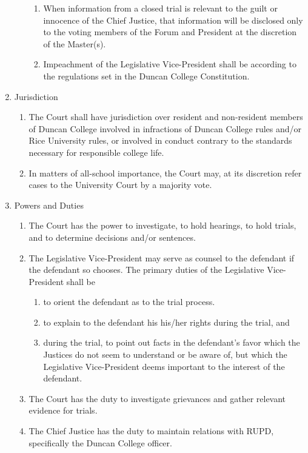 \documentclass[11pt]{amsart}
\begin{document}
\begin{enumerate}
\begin{enumerate}
\begin{enumerate}
			\item When information from a closed trial is relevant to the guilt or innocence of the Chief Justice, that information will be disclosed only to the voting members of the Forum and President at the discretion of the Master(s).
			\item Impeachment of the Legislative Vice-President shall be according to the regulations set in the Duncan College Constitution.
			\end{enumerate}
		
	\end{enumerate}
	
\item Jurisdiction
	\begin{enumerate}
		\item The Court shall have jurisdiction over resident and non-resident members of Duncan College involved in infractions of Duncan College rules and/or Rice University rules, or involved in conduct contrary to the standards necessary for responsible college life.	
		\item  In matters of all-school importance, the Court may, at its discretion refer cases to the University Court by a majority vote.
	\end{enumerate}
\item Powers and Duties
	\begin{enumerate}
	\item The Court has the power to investigate, to hold hearings, to hold trials, and to determine decisions and/or sentences.
	\item The Legislative Vice-President may serve as counsel to the defendant if the defendant so chooses. The primary duties of the Legislative Vice-President shall be 
	\begin{enumerate}
		\item to orient the defendant as to the trial process. 
		\item to explain to the defendant his his/her rights during the trial, and 
		\item during the trial, to point out facts in the defendant's favor which the Justices do not seem to understand or be aware of, but which the Legislative Vice-President deems important to the interest of the defendant.
	\end{enumerate}
	\item The Court has the duty to investigate grievances and gather relevant evidence for trials.
	\item The Chief Justice has the duty to maintain relations with RUPD, specifically the Duncan College officer.


\end{enumerate}
\end{enumerate}
\end{document}
